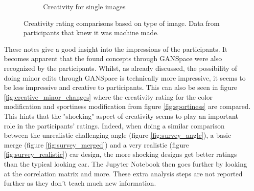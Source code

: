 \begin{figure}
\begin{subfigure}{.45\textwidth}
  \caption{Creativity for single images}
  \label{fig:creative_single_images}
\end{subfigure}
\captionsetup{width=.85\linewidth}
\captionsetup{justification=centering}
\caption{Creativity rating comparisons based on type of image. Data from participants that knew it was machine made.}
\label{fig:creativity_statistics}
\end{figure}

These notes give a good insight into the impressions of the participants.
It becomes apparent that the found concepts through GANSpace were also recognized by the participants.
Whilst, as already discussed, the possibility of doing minor edits through GANSpace is technically more impressive, it seems to be less impressive and creative to participants.
This can also be seen in figure \ref{fig:creative_minor_changes} where the creativity rating for the color modification and sportiness modification from figure \ref{fig:sportiness} are compared.
This hints that the "shocking" aspect of creativity seems to play an important role in the participants' ratings.
Indeed, when doing a similar comparison between the unrealistic challenging angle (figure \ref{fig:survey_angle}), a basic merge (figure \ref{fig:survey_merged}) and a very realistic (figure \ref{fig:survey_realistic}) car design, the more shocking designs get better ratings than the typical looking car.
The Jupyter Notebook then goes further by looking at the correlation matrix and more.
These extra analysis steps are not reported further as they don't teach much new information.